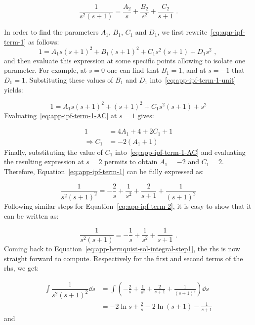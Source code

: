 \begin{equation}
    \label{eq:app-ipf-term-2}
    \dfrac{1}{s^2(s+1)} = \frac{A_2}{s} + \frac{B_2}{s^2} + \frac{C_2}{s+1}\text{ .}
\end{equation}

In order to find the parameters $A_1$, $B_1$, $C_1$ and $D_1$, we first rewrite~\eqref{eq:app-ipf-term-1} as follows:
\begin{equation}
    \label{eq:app-ipf-term-1-unit}
    1 = A_1 s(s+1)^2 + B_1 (s+1)^2 + C_1 s^2 (s+1) + D_1 s^2\text{ , }
\end{equation} and then evaluate this expression at some specific points allowing to isolate one parameter. For example, at $s=0$ one can find that $B_1=1$, and at $s=-1$ that $D_1=1$. Substituting these values of $B_1$ and $D_1$ into~\eqref{eq:app-ipf-term-1-unit} yields:

\begin{equation}
    \label{eq:app-ipf-term-1-AC}
     1 = A_1 s(s+1)^2 + (s+1)^2 + C_1 s^2 (s+1) + s^2
\end{equation} Evaluating~\eqref{eq:app-ipf-term-1-AC} at $s=1$ gives:

\begin{align}
    1 &= 4A_1 + 4 + 2C_1 + 1 \nonumber\\
    \Rightarrow C_1 &= -2(A_1+1) 
\end{align} Finally, substituting the value of $C_1$ into~\eqref{eq:app-ipf-term-1-AC} and evaluating the resulting expression at $s=2$ permits to obtain $A_1=-2$ and $C_1=2$. Therefore, Equation~\eqref{eq:app-ipf-term-1} can be fully expressed as:

\begin{equation}
    \label{eq:app-ipf-term-1-final}
    \dfrac{1}{s^2(s+1)^2} = -\frac{2}{s} + \frac{1}{s^2} + \frac{2}{s+1} + \frac{1}{(s+1)^2}
\end{equation} Following similar steps for Equation~\eqref{eq:app-ipf-term-2}, it is easy to show that it can be written as:

\begin{equation}
    \label{eq:app-ipf-term-2-final}
    \dfrac{1}{s^2(s+1)} = -\frac{1}{s} + \frac{1}{s^2} + \frac{1}{s+1}\text{ .}
\end{equation} Coming back to Equation~\eqref{eq:app-hernquist-sol-integral-step1}, the rhs is now straight forward to compute. Respectively for the first and second terms of the rhs, we get:

\begin{align}
        \label{eq:app-hernquist-rhs-term-1-final}
        \int \dfrac{1}{s^2(s+1)^2} \dd s &=  \int \left( -\frac{2}{s} + \frac{1}{s^2} + \frac{2}{s+1} + \frac{1}{(s+1)^2} \right) \dd s \nonumber \\ 
        &= -2\ln{s} + \frac{2}{s} - 2\ln{(s+1)} - \frac{1}{s+1}
\end{align} and

